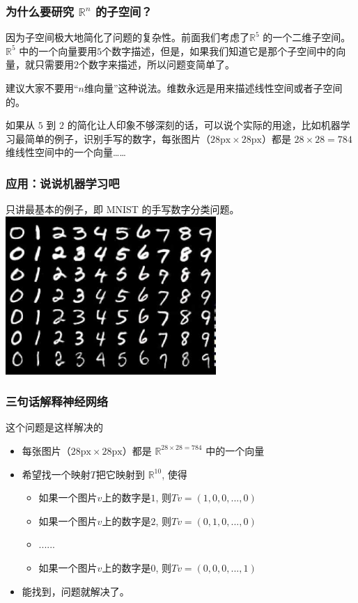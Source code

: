\documentclass[CJK]{beamer}
\begin{document}
\begin{frame}
\frametitle{为什么要研究 $\mathbb R^n$ 的子空间？}
因为子空间极大地简化了问题的复杂性。前面我们考虑了$\mathbb R^5$ 的一个二维子空间。$\mathbb R^5$ 中的一个向量要用$5$个数字描述，但是，如果我们知道它是那个子空间中的向量，就只需要用$2$个数字来描述，所以问题变简单了。

\vspace{12px}

建议大家不要用``$n$维向量''这种说法。维数永远是用来描述线性空间或者子空间的。

\vspace{12px}

如果从 $5$ 到 $2$ 的简化让人印象不够深刻的话，可以说个实际的用途，比如机器学习最简单的例子，识别手写的数字，每张图片（$28\text{px}\times 28\text{px}$）都是 $28\times 28 = 784$ 维线性空间中的一个向量……
\end{frame}

\begin{frame}
\frametitle{应用：说说机器学习吧}
只讲最基本的例子，即 MNIST 的手写数字分类问题。
\vspace{12px}
\includegraphics[height=6cm]{mnist.jpeg}
\end{frame}

\begin{frame}
\frametitle{三句话解释神经网络}
这个问题是这样解决的

\begin{itemize}
    \item 每张图片（$28\text{px}\times 28\text{px}$）都是 $\mathbb{R}^{28\times 28 = 784}$ 中的一个向量

    \item 希望找一个映射$T$把它映射到 $\mathbb R^{10}$, 使得

\begin{itemize}
    \item  如果一个图片$v$上的数字是$1$, 则$Tv = (1,0,0,..., 0)$ 
    \item  如果一个图片$v$上的数字是$2$, 则$Tv = (0,1,0,..., 0)$ 
    \item  ...... 
    \item  如果一个图片$v$上的数字是$0$, 则$Tv = (0,0,0,..., 1)$ 
\end{itemize}

	\item 能找到，问题就解决了。
\end{itemize}

\end{frame}
\end{document}
